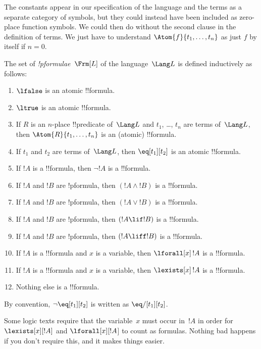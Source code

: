 \documentclass[../../include/open-logic-section]{subfiles}
\begin{document}
\begin{wordy}
The constants appear in our specification of the language and the
terms as a separate category of symbols, but they could instead have
been included as zero-place function symbols.  We could then do
without the second clause in the definition of terms. We just have to
understand $\Atom{f}{t_1, \ldots, t_n}$ as just $f$ by itself if $n =
0$.
\end{wordy}

\begin{defn}[Formula]
The set of \emph{!p{formulae}}~$\Frm[L]$ of the language~$\Lang L$
is defined inductively as follows:
\begin{enumerate}
\item $\lfalse$ is an atomic !!{formula}.
\item $\ltrue$ is an atomic !!{formula}.
\item If $R$ is an $n$-place !!{predicate} of~$\Lang L$ and $t_1$, \dots,
  $t_n$ are terms of~$\Lang L$, then $\Atom{R}{t_1,\ldots, t_n}$ is an
  (atomic) !!{formula}.
\item If $t_1$ and $t_2$ are terms of~$\Lang L$, then $\eq[t_1][t_2]$
  is an atomic !!{formula}.
\item If $!A$ is a !!{formula}, then $\lnot !A$ is a !!{formula}.
\item If $!A$ and $!B$ are !p{formula}, then $(!A \land !B)$ is a !!{formula}.
\item If $!A$ and $!B$ are !p{formula}, then $(!A \lor !B)$ is a !!{formula}.
\item If $!A$ and $!B$ are !p{formula}, then $(!A \lif !B)$ is a !!{formula}.
\item If $!A$ and $!B$ are !p{formula}, then $(!A \liff !B)$ is a !!{formula}.
\item If $!A$ is a !!{formula} and $x$ is a variable, then $\lforall[x]\,
  !A$ is a !!{formula}.
\item If $!A$ is a !!{formula} and $x$ is a variable, then $\lexists[x]\,
  !A$ is a !!{formula}.
\item Nothing else is a !!{formula}.
\end{enumerate}
\end{defn}

\begin{wordy}
By convention, $\lnot \eq[t_1][t_2]$ is written as $\eq/[t_1][t_2]$.
\end{wordy}

\begin{intro}
Some logic texts require that the variable~$x$ must occur in~$!A$ in
order for $\lexists[x][!A]$ and $\lforall[x][!A$] to count as
formulas.  Nothing bad happens if you don't require this, and it makes
things easier.
\end{intro}
\end{document}
